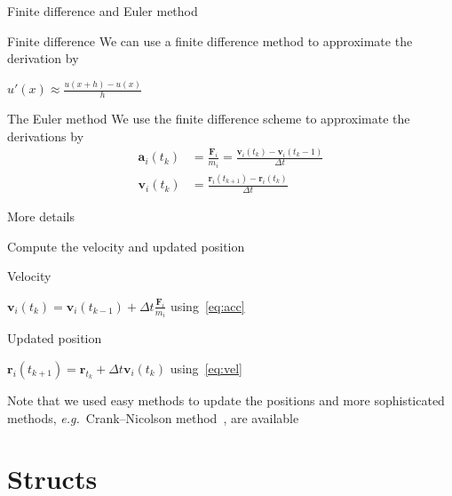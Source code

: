 \documentclass[\classoption]{beamer}
\begin{document}
\begin{frame}{Finite difference and Euler method}

\begin{block}{Finite difference}
We can use a finite difference method to approximate the derivation by
\begin{center}
$u'(x) \approx \frac{u(x+h)-u(x)}{h}$
\end{center}
\end{block}

\begin{block}{The Euler method}
We use the finite difference scheme to approximate the derivations by
\begin{align}
\mathbf{a}_i(t_k) &= \frac{\mathbf{F}_i}{m_i} = \frac{\mathbf{v}_i(t_k)-\mathbf{v}_i(t_k-1)}{\Delta t} \label{eq:acc} \\
\mathbf{v}_i(t_k) &= \frac{\mathbf{r}_i(t_{k+1})-\mathbf{r}_i(t_k)}{\Delta t}\label{eq:vel}
\end{align}
\end{block}
\vspace*{-0.4cm}
More details~\cite{strikwerda2004finite,leveque2007finite,euler1824institutionum}

\end{frame}

\begin{frame}{Compute the velocity and updated position}

\begin{block}{Velocity}
\begin{center}
$ \mathbf{v}_i(t_k) = \mathbf{v}_i(t_{k-1}) + \Delta t \frac{\mathbf{F}_i}{m_i} $ using~\eqref{eq:acc}
\end{center}
\end{block}

\begin{block}{Updated position}
\begin{center}
$\mathbf{r}_i(t_{k+1}) = \mathbf{r}_{t_k} + \Delta t \mathbf{v}_i(t_k)$ using~\eqref{eq:vel}
\end{center}
\end{block}
Note that we used easy methods to update the positions and more sophisticated methods, \emph{e.g.}\ Crank--Nicolson method~\cite{crank1947practical}, are available
\end{frame}



\section{Structs}
\end{document}
